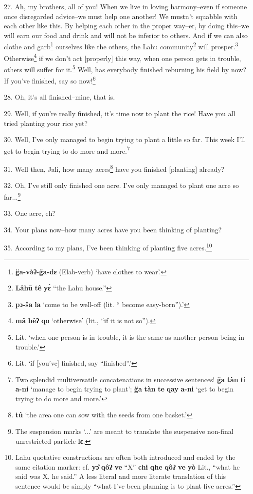 27. Ah, my brothers, all of you! When we live in loving harmony--even if someone
once disregarded advice--we must help one another! We mustn't squabble with each
other like this. By helping each other in the proper way--er, by doing this--we
will earn our food and drink and will not be inferior to others. And if we can
also clothe and garb\footnote{\textbf{g̈a-və̀ʔ-g̈a-dɛ} (Elab-verb) `have clothes to wear'.} ourselves like the others, the Lahu community\footnote{\textbf{Lâhū} \textbf{tê} \textbf{yɛ̀} ``the Lahu house.''} will
prosper.\footnote{\textbf{pɔ-ša} \textbf{la} `come to be well-off (lit. `` become easy-born'').'} Otherwise\footnote{\textbf{mâ} \textbf{hêʔ} \textbf{qo} `otherwise' (lit., ``if it is not so'').} if we don't act [properly] this way, when one person
gets in trouble, others will suffer for it.\footnote{Lit. `when one person is in trouble, it is the same as another person being in trouble.'} Well, has everybody finished reburning
his field by now? If you've finished, say so now!\footnote{Lit. `if [you've] finished, say ``finished''.'}

28. Oh, it's all finished--mine, that is.

29. Well, if you're really finished, it's time now to plant the rice! Have you
all tried planting your rice yet?

30. Well, I've only managed to begin trying to plant a little so far. This week
I'll get to begin trying to do more and more.\footnote{Two splendid multiversatile concatenations in successive sentences! \textbf{g̈a} \textbf{tàn} \textbf{ti} \textbf{a-ni} `manage to begin trying to plant'; \textbf{g̈a} \textbf{tàn} \textbf{te} \textbf{qay} \textbf{a-ni} `get to begin trying to do more and more.'}

31. Well then, Jali, how many acres\footnote{\textbf{tû} `the area one can sow with the seeds from one basket.'} have you finished [planting] already?

32. Oh, I've still only finished one acre. I've only managed to plant one acre
so far...\footnote{The suspension marks `...' are meant to translate the suspensive non-final unrestricted particle \textbf{lɛ}.}

33. One acre, eh?

34. Your plans now--how many acres have you been thinking of planting?

35. According to my plans, I've been thinking of planting five acres.\footnote{Lahu quotative constructions are often both introduced and ended by the same citation marker: cf. \textbf{yɔ̂} \textbf{qôʔ} \textbf{ve} ``X'' \textbf{chi} \textbf{qhe} \textbf{qôʔ} \textbf{ve} \textbf{yò} Lit., ``what he said was X, he said.'' A less literal and more literate translation of this sentence would be simply ``what I've been planning is to plant five acres.''}

